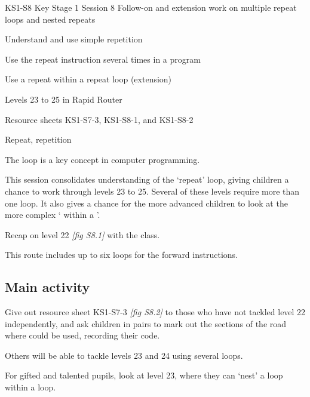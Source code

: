 \documentclass{../../../lessonplan}
\begin{document}
\lessonplantitle
    {KS1-S8}
    {Key Stage 1 Session 8}
    {Follow-on and extension work on multiple repeat loops and nested repeats}

\preamble
    {
    \item Understand and use simple repetition
    \item Use the repeat instruction several times in a program
    \item Use a repeat within a repeat loop (extension)
    }
    {
    \item Levels 23 to 25 in Rapid Router  
    \item Resource sheets KS1-S7-3, KS1-S8-1, and KS1-S8-2
    }
    {
    \item Repeat, repetition
    }

\begin{lessonplan}

The  loop is a key concept in computer programming.

This session consolidates understanding of the `repeat' loop, giving children a chance to work through levels 23 to 25.
Several of these levels require more than one  loop.
It also gives a chance for the more advanced children to look at the more complex ` within a '.

Recap on level 22 \textit{[fig S8.1]} with the class.



This route includes up to six  loops for the forward instructions.

\subsection*{Main activity}

Give out resource sheet KS1-S7-3 \textit{[fig S8.2]} to those who have not tackled level 22 independently, and ask children in pairs to mark out the sections of the road where  could be used, recording their code.


Others will be able to tackle levels 23 and 24 using several  loops.

For gifted and talented pupils, look at level 23, where they can `nest' a  loop within a  loop.


\end{lessonplan}
\end{document}
